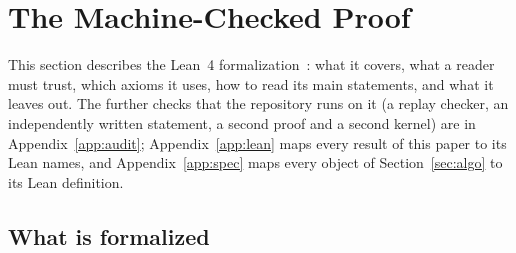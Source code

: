 \documentclass[runningheads,11pt]{llncs}
\begin{document}
\section{The Machine-Checked Proof}\label{sec:lean}

This section describes the Lean~4 formalization~\cite{Repo}: what it covers, what a reader must trust, which axioms it uses, how to read its main statements, and what it leaves out. The further checks that the repository runs on it (a replay checker, an independently written statement, a second proof and a second kernel) are in Appendix~\ref{app:audit}; Appendix~\ref{app:lean} maps every result of this paper to its Lean names, and Appendix~\ref{app:spec} maps every object of Section~\ref{sec:algo} to its Lean definition.

\subsection{What is formalized}\label{sec:lean-what}
\end{document}
